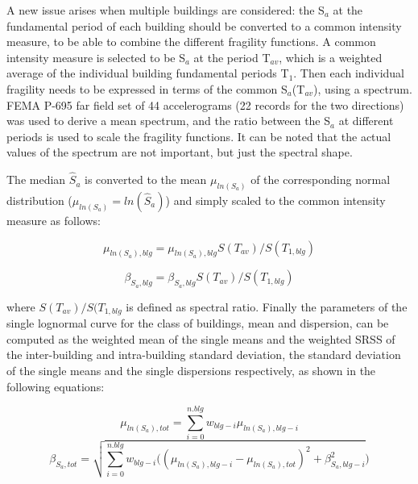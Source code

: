 A new issue arises when multiple buildings are considered: the S$_a$ at the fundamental period of each building should be converted to a common intensity measure, to be able to combine the different fragility functions. A common intensity measure is selected to be S$_a$ at the period T$_{av}$, which is a weighted average of the individual building fundamental periods T$_1$. Then each individual fragility needs to be expressed in terms of the common S$_a$(T$_{av}$), using a spectrum. FEMA P-695 \citep{ATC2007} far field set of 44 accelerograms (22 records for the two directions) was used to derive a mean spectrum, and the ratio between the S$_a$ at different periods is used to scale the fragility functions. It can be noted that the actual values of the spectrum are not important, but just the spectral shape.

The median $\hat{S}_a$ is converted to the mean $\mu_{ln(S_a)}$ of the corresponding normal distribution ($\mu_{ln(S_a)} = ln(\hat{S}_a)$) and simply scaled to the common intensity measure as follows:

\begin{equation}
	\mu_{ln(S_a), blg} = \mu_{ln(S_a), blg} S(T_{av})/ S(T_{1, blg})
\end{equation}

\begin{equation}
	\beta_{S_a, blg} = \beta_{S_a, blg} S(T_{av})/ S(T_{1, blg})
	\label{eq:Sa(Tav)}
\end{equation}

where $S(T_{av})/ S(T_{1, blg}$ is defined as spectral ratio. Finally the parameters of the single lognormal curve for the class of buildings, mean and dispersion, can be computed as the weighted mean of the single means and the weighted SRSS of the inter-building and intra-building standard deviation, the standard deviation of the single means and the single dispersions respectively, as shown in the following equations:

\begin{equation}
\mu_{ln(S_a), tot} = \sum_{i=0}^{n.blg} w_{blg-i} \mu_{ln(S_a), blg-i}
\label{eq:combination-lognormals-mu}
\end{equation}
\begin{equation}
\beta_{S_a, tot} = \sqrt{ \sum_{i=0}^{n.blg} w_{blg-i} ((\mu_{ln(S_a), blg-i}-\mu_{ln(S_a), tot})^2+ \beta_{S_a, blg-i}^2})
\label{eq:combination-lognormals-sigma}
\end{equation}

